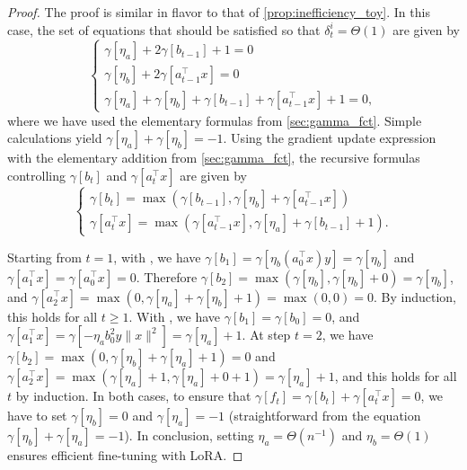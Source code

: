 \begin{proof}
The proof is similar in flavor to that of \cref{prop:inefficiency_toy}. In this case, the set of equations that should be satisfied so that $\delta_t^i = \Theta(1)$ are given by
\begin{equation*}
    \begin{cases}
        \gamma[\eta_a]+2\gamma[b_{t-1}] + 1 = 0\\
        \gamma[\eta_b] + 2 \gamma[a_{t-1}^\top x] = 0\\
        \gamma[\eta_a] + \gamma[\eta_b]+\gamma[b_{t-1}] + \gamma[a_{t-1}^\top x]+1 = 0,        
    \end{cases}
\end{equation*}
where we have used the elementary formulas from \cref{sec:gamma_fct}. Simple calculations yield $\gamma[\eta_a] + \gamma[\eta_b] = -1$. Using the gradient update expression with the elementary addition from \cref{sec:gamma_fct}, the recursive formulas controlling $\gamma[b_t]$ and $\gamma[a_t^\top x]$ are given by
\begin{equation*}
    \begin{cases}
        \gamma[b_t] = \max(\gamma[b_{t-1}], \gamma[\eta_b] + \gamma[a_{t-1}^\top x]) \\
        \gamma[a_t^\top x] = \max(\gamma[a_{t-1}^\top x], \gamma[\eta_a]+\gamma[b_{t-1}]+1). 
    \end{cases}
\end{equation*}

Starting from $t=1$, with , we have $\gamma[b_1] = \gamma[\eta_b (a_0^\top x) y] = \gamma[\eta_b]$ and $\gamma[a_1^\top x] = \gamma[a_0^\top x] = 0$. Therefore $\gamma[b_2] = \max(\gamma[\eta_b], \gamma[\eta_b] + 0) = \gamma[\eta_b]$, and $\gamma[a_2^\top x] = \max(0, \gamma[\eta_a] + \gamma[\eta_b] +1) = \max(0,0) = 0$. By induction, this holds for all $t\geq 1$. With , we have $\gamma[b_1] = \gamma[b_0] = 0$, and $\gamma[a_1^\top x] = \gamma[-\eta_a b_0^2 y \|x\|^2] = \gamma[\eta_a] + 1$. At step $t=2$, we have $\gamma[b_2] = \max(0, \gamma[\eta_b] + \gamma[\eta_a] + 1) = 0$ and $\gamma[a_2^\top x] = \max(\gamma[\eta_a] + 1, \gamma[\eta_a] + 0 + 1) = \gamma[\eta_a] + 1$, and this holds for all $t$ by induction. In both cases, to ensure that $\gamma[f_t] = \gamma[b_t] + \gamma[a_t^\top x] = 0$, we have to set $\gamma[\eta_b] = 0$ and $\gamma[\eta_a]=-1$ (straightforward from the equation $\gamma[\eta_b] + \gamma[\eta_a] = -1$). In conclusion, setting $\eta_a = \Theta(n^{-1})$ and $\eta_b = \Theta(1)$ ensures efficient fine-tuning with LoRA.

\end{proof}



